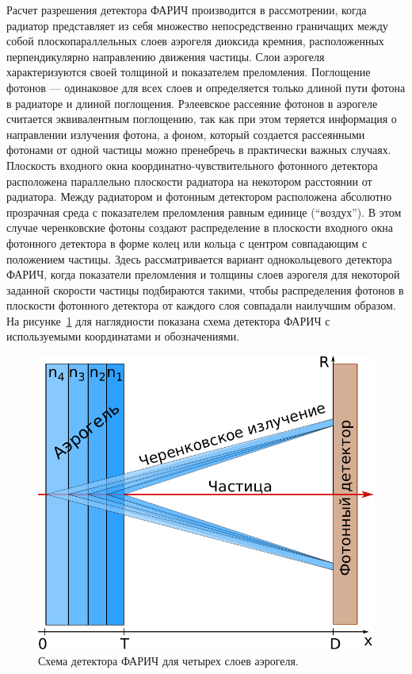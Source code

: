 \documentclass[12pt]{article}
\begin{document}
Расчет разрешения детектора ФАРИЧ производится в рассмотрении, когда радиатор представляет из себя множество непосредственно граничащих между 
собой плоскопараллельных слоев аэрогеля диоксида кремния, расположенных перпендикулярно направлению движения частицы. Слои аэрогеля характеризуются своей 
толщиной и показателем преломления. Поглощение фотонов --- одинаковое для всех слоев и определяется только длиной пути фотона в радиаторе и длиной поглощения. 
Рэлеевское рассеяние фотонов в аэрогеле считается эквивалентным поглощению, 
так как при этом теряется информация о направлении излучения фотона, а фоном, который создается рассеянными фотонами от одной частицы можно пренебречь в практически важных случаях. 
Плоскость входного окна координатно-чувствительного фотонного детектора расположена параллельно плоскости радиатора на некотором расстоянии от радиатора. 
Между радиатором и фотонным детектором расположена абсолютно прозрачная среда с показателем преломления равным единице (``воздух''). 
В этом случае черенковские фотоны создают распределение в плоскости входного окна фотонного детектора в форме колец или кольца с центром 
совпадающим с положением частицы. Здесь рассматривается вариант однокольцевого детектора ФАРИЧ, когда показатели преломления и толщины 
слоев аэрогеля для некоторой заданной скорости частицы подбираются такими, чтобы распределения фотонов в плоскости фотонного детектора от каждого слоя совпадали наилучшим образом.
На рисунке~\ref{fig:farich} для наглядности показана схема детектора ФАРИЧ с используемыми координатами и обозначениями.

\begin{figure}[htb]
\begin{center}
\includegraphics[width=0.4\textheight]{farich_scheme.pdf}
\caption{\small Схема детектора ФАРИЧ для четырех слоев аэрогеля.}
\label{fig:farich}
\end{center}
\end{figure}
\end{document}
